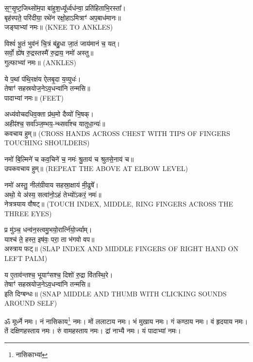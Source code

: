 स॒ꣳ॒सृ॒ष्ट॒जिथ्सो॑म॒पा बा॑हुश॒ध्यू᳚र्ध्वध॑न्वा॒ प्रति॑हिताभि॒रस्ता᳚।\\
बृह॑स्पते॒ परि॑दीया॒ रथे॑न रक्षो॒हाऽमित्राꣳ॑ अप॒बाध॑मानः॥\\
जङ्घाभ्यां नमः॥ {\scriptsize (KNEE TO ANKLES)}

विश्वं॑ भू॒तं भुव॑नं चि॒त्रं ब॑हु॒धा जा॒तं जाय॑मानं च॒ यत्।\\
सर्वो॒ ह्ये॑ष रु॒द्रस्तस्मै॑ रु॒द्राय॒ नमो॑ अस्तु॥\\
गुल्फाभ्यां नमः॥ {\scriptsize (ANKLES)}

ये प॒थां प॑थि॒रक्ष॑य ऐलबृ॒दा य॒व्युधः॑।\\
तेषाꣳ॑ सहस्रयोज॒नेऽव॒धन्वा॑नि तन्मसि॥ \\
पादाभ्यां नमः॥ {\scriptsize (FEET)}


अध्य॑वोचदधिव॒क्ता प्र॑थ॒मो दैव्यो॑ भि॒षक्।\\
अहीꣴ॑श्च॒ सर्वा᳚ञ्ज॒म्भय॒-न्थ्सर्वा᳚श्च यातुधा॒न्यः॑॥\\
कवचाय हुम्॥ {\scriptsize (CROSS HANDS ACROSS CHEST WITH TIPS OF FINGERS TOUCHING SHOULDERS)}


नमो॑ बि॒ल्मिने॑ च कव॒चिने॑ च॒ नमः॑ श्रु॒ताय॑ च श्रुतसे॒नाय॑ च॥\\
उपकवचाय हुम्॥ {\scriptsize (REPEAT THE ABOVE AT ELBOW LEVEL)}

नमो॑ अस्तु॒ नील॑ग्रीवाय सहस्रा॒क्षाय॑ मी॒ढुषे᳚। \\
अथो॒ ये अ॑स्य॒ सत्वा॑नो॒ऽहं तेभ्यो॑ऽकरं॒ नमः॑॥ \\
नेत्रत्रयाय वौषट्॥ {\scriptsize (TOUCH INDEX, MIDDLE, RING FINGERS ACROSS THE THREE EYES)}


प्र मु॑ञ्च॒ धन्व॑न॒स्त्वमु॒भयो॒रार्त्नि॑यो॒र्ज्याम्।\\
याश्च॑ ते॒ हस्त॒ इष॑वः॒ परा॒ ता भ॑गवो वप॥\\ 
अस्त्राय फट्॥ {\scriptsize (SLAP INDEX AND MIDDLE FINGERS OF RIGHT HAND ON LEFT PALM)}

य ए॒ताव॑न्तश्च॒ भूयाꣳ॑सश्च॒ दिशो॑ रु॒द्रा वि॑तस्थि॒रे।\\
 तेषाꣳ॑ सहस्रयोज॒नेऽव॒धन्वा॑नि तन्मसि॥ \\
इति दिग्बन्धः॥ {\scriptsize (SNAP MIDDLE AND THUMB WITH CLICKING SOUNDS AROUND SELF)}

{\small \closesection}

ॐ मूर्ध्ने नमः। नं नासिकाय\footnote{नासिकाभ्यां} नमः। मों ललाटाय नमः। भं मुखाय नमः। गं कण्ठाय नमः। वं हृदयाय नमः। तें दक्षिणहस्ताय नमः। रुं वामहस्ताय नमः। द्रां नाभ्यै नमः। यं पादाभ्यां नमः।

